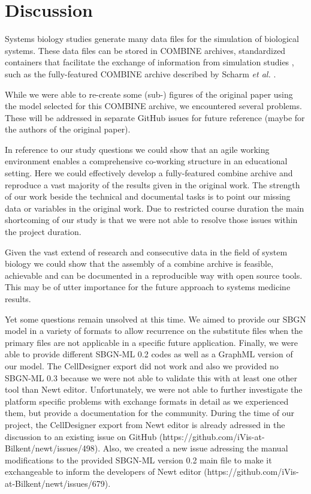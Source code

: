 \section*{Discussion}
Systems biology studies generate many data files for the simulation of biological systems. These data files can be stored in COMBINE archives, standardized containers that facilitate the exchange of information from simulation studies \cite{Bergmann.2014}, such as the fully-featured COMBINE archive described by Scharm \textit{et al.} \cite{combine}.

While we were able to re-create some (sub-) figures of the original paper using the model selected for this COMBINE archive, we encountered several problems. These will be addressed in separate GitHub issues for future reference (maybe for the authors of the original paper).

In reference to our study questions we could show that an agile working environment enables a comprehensive co-working structure in an educational setting. Here we could effectively develop a fully-featured \ac{combine} archive and reproduce a vast majority of the results given in the original work. The strength of our work beside the technical and documental tasks is to point our missing data or variables in the original work. Due to restricted course duration the main shortcoming of our study is that we were not able to resolve those issues within the project duration.

Given the vast extend of research and consecutive data in the field of system biology we could show that the assembly of a \ac{combine} archive is feasible, achievable and can be documented in a reproducible way with open source tools. This may be of utter importance for the future approach to systems medicine results. 

Yet some questions remain unsolved at this time. We aimed to provide our SBGN model in a variety of formats to allow recurrence on the substitute files when the primary files are not applicable in a specific future application. Finally, we were able to provide different SBGN-ML 0.2 codes as well as a GraphML version of our model. The CellDesigner export did not work and also we provided no SBGN-ML 0.3 because we were not able to validate this with at least one other tool than Newt editor. Unfortunately, we were not able to further investigate the platform specific problems with exchange formats in detail as we experienced them, but provide a documentation for the community. During the time of our project, the CellDesigner export from Newt editor is already adressed in the discussion to an existing issue on GitHub (https://github.com/iVis-at-Bilkent/newt/issues/498). Also, we created a new issue adressing the manual modifications to the provided SBGN-ML version 0.2 main file to make it exchangeable to inform the developers of Newt editor (https://github.com/iVis-at-Bilkent/newt/issues/679).

